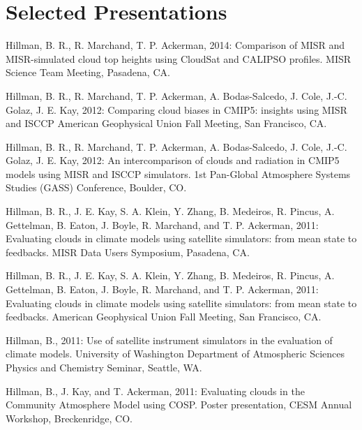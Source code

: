 \documentclass[10pt]{article}
\newenvironment{itemize*}{
   \begin{list}{}
      { 
         \setlength{\itemsep}{5pt}
         \setlength{\parsep}{0pt}
         \setlength{\topsep}{0pt}
         \setlength{\leftmargin}{0em} 
      } 
} {
   \end{list}
}
\begin{document}
\section*{Selected Presentations}
\begin{itemize*}

   \item Hillman, B. R., R. Marchand, T. P. Ackerman,
   2014:
   Comparison of MISR and MISR-simulated cloud top heights using CloudSat and CALIPSO profiles.
   MISR Science Team Meeting,
   Pasadena, CA.

   \item Hillman, B. R., R. Marchand, T. P. Ackerman, A. Bodas-Salcedo, J. Cole, J.-C. Golaz, J. E. Kay,
   2012:
   Comparing cloud biases in CMIP5: insights using MISR and ISCCP
   American Geophysical Union Fall Meeting, 
   San Francisco, CA.

   \item Hillman, B. R., R. Marchand, T. P. Ackerman, A. Bodas-Salcedo, J. Cole, J.-C. Golaz, J. E. Kay,
   2012:
   An intercomparison of clouds and radiation in CMIP5 models
   using MISR and ISCCP simulators.
   1st Pan-Global Atmosphere Systems Studies (GASS) Conference,
   Boulder, CO.

   \item Hillman, B. R., J. E. Kay, S. A. Klein, Y. Zhang, B. Medeiros,
   R. Pincus, A. Gettelman, B. Eaton, J. Boyle, R. Marchand, and T. P. Ackerman, 
   2011:
   Evaluating clouds in climate models using satellite simulators: 
   from mean state to feedbacks.
   MISR Data Users Symposium, 
   Pasadena, CA.

    \item Hillman, B. R., J. E. Kay, S. A. Klein, Y. Zhang, B. Medeiros,
    R. Pincus, A. Gettelman, B. Eaton, J. Boyle, R. Marchand, and T. P. Ackerman, 
    2011:
    Evaluating clouds in climate models using satellite simulators: 
    from mean state to feedbacks.
    American Geophysical Union Fall Meeting, 
    San Francisco, CA.

    \item Hillman, B.,
    2011:
    Use of satellite instrument simulators in the evaluation of climate models.
    University of Washington Department of Atmospheric Sciences 
    Physics and Chemistry Seminar,
    Seattle, WA.

    \item Hillman, B., J. Kay, and T. Ackerman, 2011:
    Evaluating clouds in the Community Atmosphere Model using COSP.
    Poster presentation, CESM Annual Workshop,
    Breckenridge, CO.


\end{itemize*}
\end{document}
